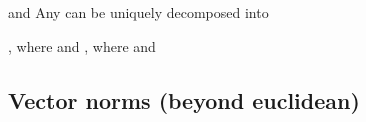 \begin{itemize}
\begin{itemize}
                  \vItem
                         and
                  \vItem
                        Any  can be uniquely decomposed
                        into

                        \begin{itemize}

                              \vItem
                                    , where
                                     and
                              \vItem
                                    , where
                                     and
                        \end{itemize}
            \end{itemize}
\end{itemize}

\subsection*{Vector norms (beyond euclidean)}

